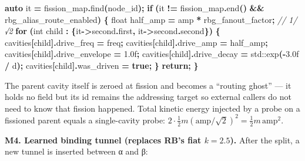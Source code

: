 \documentclass[
  11pt,
  a4paper,
]{article}
\newenvironment{Shaded}{\begin{snugshade}}{\end{snugshade}}
\newcommand{\BuiltInTok}[1]{#1}
\newcommand{\CommentTok}[1]{\textcolor[rgb]{0.56,0.35,0.01}{\textit{#1}}}
\newcommand{\ControlFlowTok}[1]{\textcolor[rgb]{0.13,0.29,0.53}{\textbf{#1}}}
\newcommand{\DataTypeTok}[1]{\textcolor[rgb]{0.13,0.29,0.53}{#1}}
\newcommand{\FloatTok}[1]{\textcolor[rgb]{0.00,0.00,0.81}{#1}}
\newcommand{\KeywordTok}[1]{\textcolor[rgb]{0.13,0.29,0.53}{\textbf{#1}}}
\newcommand{\NormalTok}[1]{#1}
\newcommand{\OperatorTok}[1]{\textcolor[rgb]{0.81,0.36,0.00}{\textbf{#1}}}
\begin{document}
\begin{Shaded}
\begin{Highlighting}[]
\KeywordTok{auto}\NormalTok{ it }\OperatorTok{=}\NormalTok{ fission\_map}\OperatorTok{.}\NormalTok{find}\OperatorTok{(}\NormalTok{node\_id}\OperatorTok{);}
\ControlFlowTok{if} \OperatorTok{(}\NormalTok{it }\OperatorTok{!=}\NormalTok{ fission\_map}\OperatorTok{.}\NormalTok{end}\OperatorTok{()} \OperatorTok{\&\&}\NormalTok{ rbg\_alias\_route\_enabled}\OperatorTok{)} \OperatorTok{\{}
    \DataTypeTok{float}\NormalTok{ half\_amp }\OperatorTok{=}\NormalTok{ amp }\OperatorTok{*}\NormalTok{ rbg\_fanout\_factor}\OperatorTok{;}   \CommentTok{// 1/√2}
    \ControlFlowTok{for} \OperatorTok{(}\DataTypeTok{int}\NormalTok{ child }\OperatorTok{:} \OperatorTok{\{}\NormalTok{it}\OperatorTok{{-}\textgreater{}}\NormalTok{second}\OperatorTok{.}\NormalTok{first}\OperatorTok{,}\NormalTok{ it}\OperatorTok{{-}\textgreater{}}\NormalTok{second}\OperatorTok{.}\NormalTok{second}\OperatorTok{\})} \OperatorTok{\{}
\NormalTok{        cavities}\OperatorTok{[}\NormalTok{child}\OperatorTok{].}\NormalTok{drive\_freq     }\OperatorTok{=}\NormalTok{ freq}\OperatorTok{;}
\NormalTok{        cavities}\OperatorTok{[}\NormalTok{child}\OperatorTok{].}\NormalTok{drive\_amp      }\OperatorTok{=}\NormalTok{ half\_amp}\OperatorTok{;}
\NormalTok{        cavities}\OperatorTok{[}\NormalTok{child}\OperatorTok{].}\NormalTok{drive\_envelope }\OperatorTok{=} \FloatTok{1.0}\BuiltInTok{f}\OperatorTok{;}
\NormalTok{        cavities}\OperatorTok{[}\NormalTok{child}\OperatorTok{].}\NormalTok{drive\_decay    }\OperatorTok{=} \BuiltInTok{std::}\NormalTok{exp}\OperatorTok{({-}}\FloatTok{3.0}\BuiltInTok{f} \OperatorTok{/}\NormalTok{ d}\OperatorTok{);}
\NormalTok{        cavities}\OperatorTok{[}\NormalTok{child}\OperatorTok{].}\NormalTok{was\_driven     }\OperatorTok{=} \KeywordTok{true}\OperatorTok{;}
    \OperatorTok{\}}
    \ControlFlowTok{return}\OperatorTok{;}
\OperatorTok{\}}
\end{Highlighting}
\end{Shaded}

The parent cavity itself is zeroed at fission and becomes a ``routing
ghost'' --- it holds no field but its id remains the addressing target
so external callers do not need to know that fission happened. Total
kinetic energy injected by a probe on a fissioned parent equals a
single-cavity probe:
\(2 \cdot \frac{1}{2} m (\text{amp}/\sqrt{2})^2 = \frac{1}{2} m \, \text{amp}^2\).

\textbf{M4. Learned binding tunnel (replaces RB's fiat \(k=2.5\)).}
After the split, a new tunnel is inserted between α and β:
\end{document}
